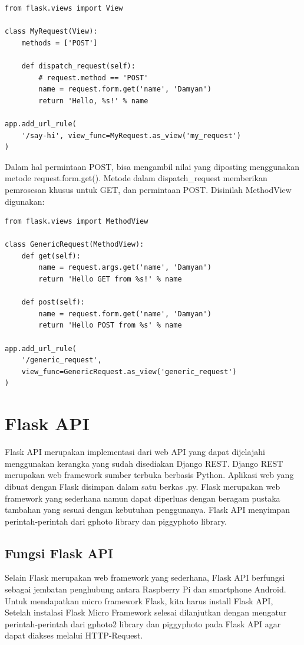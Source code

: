 \begin{verbatim}
from flask.views import View

class MyRequest(View):
    methods = ['POST']

    def dispatch_request(self):
        # request.method == 'POST'
        name = request.form.get('name', 'Damyan')
        return 'Hello, %s!' % name

app.add_url_rule(
    '/say-hi', view_func=MyRequest.as_view('my_request')
)
\end{verbatim}

Dalam hal permintaan POST, bisa mengambil nilai yang diposting menggunakan metode request.form.get(). Metode dalam dispatch_request memberikan pemrosesan khusus untuk GET, dan permintaan POST. Disinilah MethodView digunakan:

\begin{verbatim}
from flask.views import MethodView

class GenericRequest(MethodView):
    def get(self):
        name = request.args.get('name', 'Damyan')
        return 'Hello GET from %s!' % name

    def post(self):
        name = request.form.get('name', 'Damyan')
        return 'Hello POST from %s' % name

app.add_url_rule(
    '/generic_request',
    view_func=GenericRequest.as_view('generic_request')
)
\end{verbatim}

\section{Flask API}
Flask API merupakan implementasi dari web API yang dapat dijelajahi menggunakan kerangka yang sudah disediakan Django REST. Django REST merupakan web framework sumber terbuka berbasis Python. Aplikasi web yang dibuat dengan Flask disimpan dalam satu berkas .py. Flask merupakan web framework yang sederhana namun dapat diperluas dengan beragam pustaka tambahan yang sesuai dengan kebutuhan penggunanya. Flask API menyimpan perintah-perintah dari gphoto library dan piggyphoto library\cite{computingaplikasi}.

\subsection{Fungsi Flask API}
Selain Flask merupakan web framework yang sederhana, Flask API berfungsi sebagai jembatan penghubung antara Raspberry Pi dan smartphone Android. Untuk mendapatkan micro framework Flask, kita harus install Flask API, Setelah instalasi Flask Micro Framework selesai dilanjutkan dengan mengatur perintah-perintah dari gphoto2 library dan piggyphoto pada Flask API agar dapat diakses melalui HTTP-Request\cite{computingaplikasi}.


